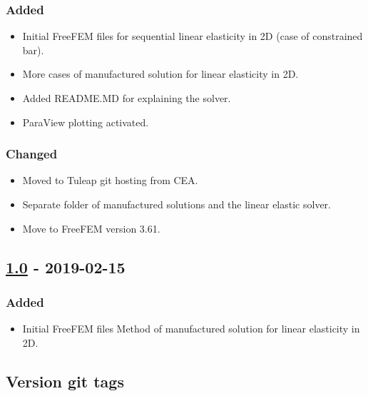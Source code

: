 \subsubsection{Added}

\begin{itemize}
\tightlist
\item
  Initial FreeFEM files for sequential linear elasticity in 2D (case of
  constrained bar).
\item
  More cases of manufactured solution for linear elasticity in 2D.
\item
  Added README.MD for explaining the solver.
\item
  ParaView plotting activated.
\end{itemize}

\subsubsection{Changed}

\begin{itemize}
\tightlist
\item
  Moved to Tuleap git hosting from CEA.
\item
  Separate folder of manufactured solutions and the linear elastic
  solver.
\item
  Move to FreeFEM version 3.61.
\end{itemize}

\subsection{\texorpdfstring{\href{https://gitlab.com/PsdSolver/psd_sources/-/tree/v1.0}{1.0}
- 2019-02-15}{1.0 - 2019-02-15}}

\subsubsection{Added}

\begin{itemize}
\tightlist
\item
  Initial FreeFEM files Method of manufactured solution for linear
  elasticity in 2D.
\end{itemize}

\subsection{Version git tags}

